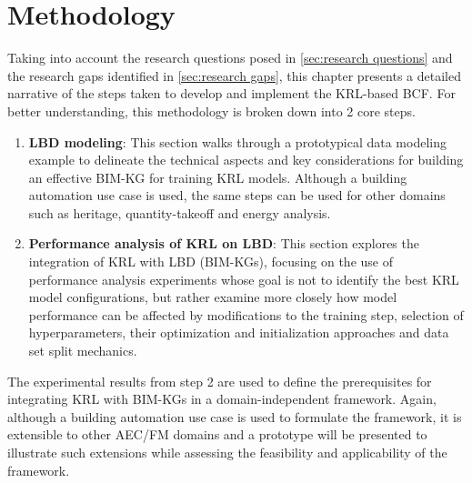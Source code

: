 \chapter{Methodology}
\label{chap:Research methods}

Taking into account the research questions posed in \autoref{sec:research questions} and the research gaps identified in \autoref{sec:research gaps}, this chapter presents a detailed narrative of the steps taken to develop and implement the \ac{KRL-based BCF}. For better understanding, this methodology is broken down into 2 core steps.

\begin{enumerate}
    \item 
    \textbf{\acf{LBD} modeling}: This section walks through a prototypical data modeling example to delineate the technical aspects and key considerations for building an effective \ac{BIM-KG} for training \ac{KRL} models. Although a building automation use case is used, the same steps can be used for other domains such as heritage, quantity-takeoff and energy analysis. 

    \item 
    \textbf{Performance analysis of \ac{KRL} on \ac{LBD}}: This section explores the integration of \ac{KRL} with \ac{LBD} (\acp{BIM-KG}), focusing on the use of performance analysis experiments whose goal is not to identify the best \ac{KRL} model configurations, but rather examine more closely how model performance can be affected by modifications to the training step, selection of hyperparameters, their optimization and initialization approaches and data set split mechanics.
\end{enumerate}

The experimental results from step 2 are used to define the prerequisites for integrating \ac{KRL} with \acp{BIM-KG} in a domain-independent framework. Again, although a building automation use case is used to formulate the framework, it is extensible to other \ac{AEC/FM} domains and a prototype will be presented to illustrate such extensions while assessing the feasibility and applicability of the framework.

